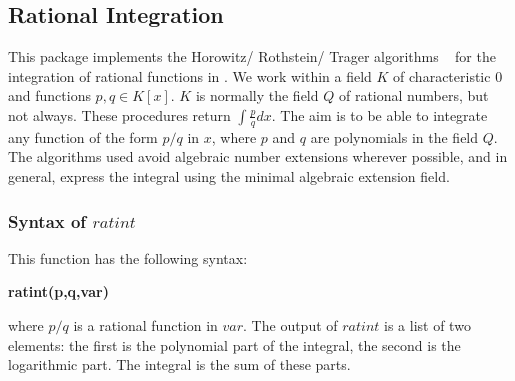 
\subsection{Rational Integration}

This package implements the Horowitz/ Rothstein/ Trager algorithms ~\cite{Geddes:92} for the integration of rational functions in \REDUCE. We work within a field $K$ of characteristic $0$ and functions $p,q \in K[x]$. $K$ is normally the field $Q$ of rational numbers, but not always. These procedures return $\int \frac{p}{q} dx.$
 The aim is to be able to integrate any function of the form $p/q$ in $x$, where $p$ and $q$ are polynomials in the field $Q$. The algorithms used avoid algebraic number extensions wherever possible, and in general, express the integral using the minimal algebraic extension field. 

\subsubsection{Syntax of $ratint$}
This function has the following syntax:
\begin{center} \textbf{ratint(p,q,var)} \end{center}
where $ p/q$ is a rational function in $var$. The output of $ratint$ is a list of two elements: the first is the polynomial part of the integral, the second is the logarithmic part. The integral is the sum of these parts.
